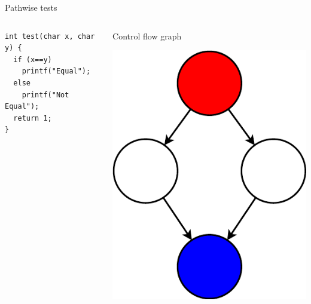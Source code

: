 \documentclass{beamer}
\begin{document}
\begin{frame}[fragile]{Pathwise tests}
  \begin{columns}
    \begin{column}{0.5\textwidth}
      \begin{verbatim}
int test(char x, char y) {
  if (x==y)
    printf("Equal");
  else
    printf("Not Equal");
  return 1;
}
      \end{verbatim}
    \end{column}
    \begin{column}{0.5\textwidth}
      Control flow graph

      \includegraphics[height=0.6\textheight]{Control_flow_graph}
    \end{column}
  \end{columns}
\end{frame}
\end{document}
